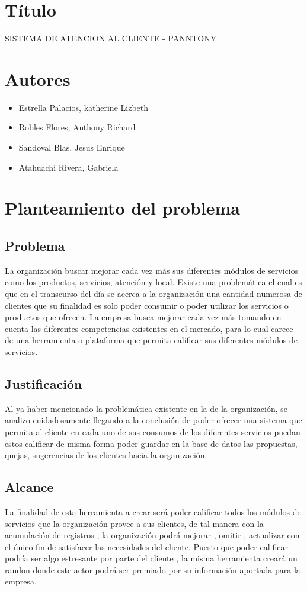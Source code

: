 \documentclass[preprint,12pt]{elsarticle}
\begin{document}
\section{Título}
SISTEMA DE ATENCION AL CLIENTE - PANNTONY

\section{Autores}
\begin{itemize}
	\item Estrella Palacios, katherine Lizbeth
	\item Robles Flores, Anthony Richard
	\item Sandoval Blas, Jesus Enrique
	\item Atahuachi Rivera, Gabriela    
\end{itemize}

\section{Planteamiento del problema}
	\subsection{Problema }	
		La organización buscar mejorar cada vez más sus diferentes módulos de servicios como los productos, servicios, atención y local.
		Existe una problemática el cual es que en el transcurso del día se acerca a la organización una cantidad numerosa de clientes que su finalidad es solo poder consumir o poder utilizar los servicios o productos que ofrecen.
		La empresa busca mejorar cada vez más tomando en cuenta las diferentes competencias existentes en el mercado, para lo cual carece de una herramienta o plataforma que permita calificar sus diferentes módulos de servicios.

	\subsection{Justificación }	
		Al ya haber mencionado la problemática existente en la de la organización, se analizo cuidadosamente llegando  a la conclusión de poder ofrecer una sistema que permita al cliente en cada uno de sus consumos de los diferentes servicios puedan estos calificar de 			misma forma poder guardar en la base de datos las propuestas, quejas, sugerencias de los clientes hacia la organización.
	\subsection{Alcance }
		La finalidad de esta herramienta a crear será poder calificar todos los módulos de servicios que la organización provee a sus clientes, de tal manera con la acumulación de registros , la organización podrá mejorar , omitir , actualizar con el único fin de satisfacer las 			necesidades del cliente.
		Puesto que poder calificar podría ser algo estresante por parte del cliente , la misma herramienta creará un randon donde este actor podrá ser premiado por su información aportada para la empresa.
\end{document}

